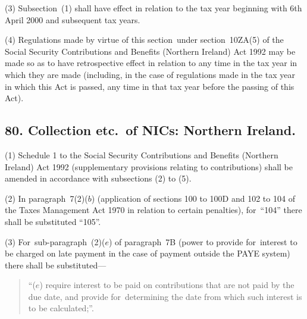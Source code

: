 \documentclass[12pt,a4paper]{article}
\begin{document}

(3) Subsection~(1)  shall have effect in relation to the tax year beginning with 6th April 2000 and subsequent tax years.

(4) Regulations made by virtue of this section~under section~10ZA(5)  of the  Social Security Contributions and Benefits (Northern Ireland) Act 1992 may be made so as to have retrospective effect in relation to any time in the tax year in which they are made (including, in the case of regulations made in the tax year in which this Act is passed, any time in that tax year before the passing of this Act).


\subsection{80. Collection etc.\ of NICs: Northern Ireland.}

(1) Schedule 1 to the Social Security Contributions and Benefits (Northern Ireland) Act 1992 (supplementary provisions relating to contributions) shall be amended in accordance with subsections (2)  to (5).

(2) In paragraph~7(2)($b$)  (application of sections 100 to 100D and 102 to 104 of the Taxes Management Act 1970 in relation to certain penalties), for~“104” there shall be substituted “105”.

(3) For~sub-paragraph~(2)($e$)  of paragraph~7B (power to provide for~interest to be charged on late payment in the case of payment outside the PAYE system) there shall be substituted—
\begin{quotation}
“($e$) require interest to be paid on contributions that are not paid by the due date, and provide for~determining the date from which such interest is to be calculated;”.
\end{quotation}
\end{document}
